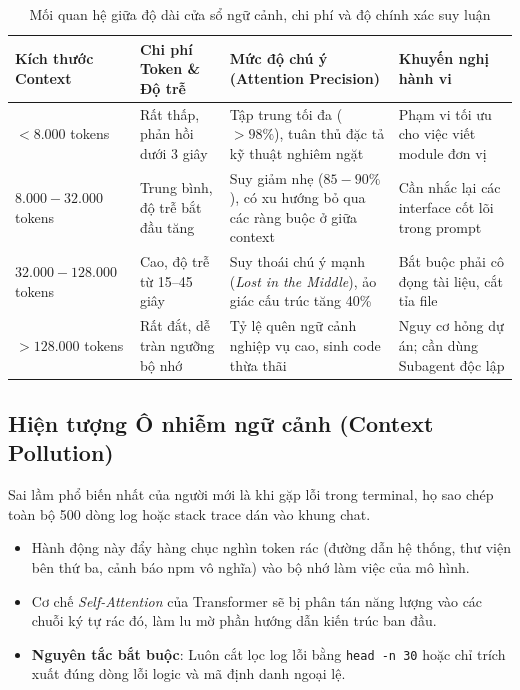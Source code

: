 \documentclass[a4paper,11pt]{article}
\begin{document}
\begin{table}[htbp]
\centering
\small
\caption{Mối quan hệ giữa độ dài cửa sổ ngữ cảnh, chi phí và độ chính xác suy luận}
\vspace{0.5em}
\begin{tabularx}{\textwidth}{L{2.5cm} L{3.5cm} L{4.5cm} Y}
\toprule
\textbf{Kích thước Context} & \textbf{Chi phí Token \& Độ trễ} & \textbf{Mức độ chú ý (Attention Precision)} & \textbf{Khuyến nghị hành vi} \\
\midrule
$< 8.000$ tokens & Rất thấp, phản hồi dưới 3 giây & Tập trung tối đa ($> 98\%$), tuân thủ đặc tả kỹ thuật nghiêm ngặt & Phạm vi tối ưu cho việc viết module đơn vị \\
$8.000 - 32.000$ tokens & Trung bình, độ trễ bắt đầu tăng & Suy giảm nhẹ ($85 - 90\%$), có xu hướng bỏ qua các ràng buộc ở giữa context & Cần nhắc lại các interface cốt lõi trong prompt \\
$32.000 - 128.000$ tokens & Cao, độ trễ từ 15--45 giây & Suy thoái chú ý mạnh (\textit{Lost in the Middle}), ảo giác cấu trúc tăng 40\% & Bắt buộc phải cô đọng tài liệu, cắt tỉa file \\
$> 128.000$ tokens & Rất đắt, dễ tràn ngưỡng bộ nhớ & Tỷ lệ quên ngữ cảnh nghiệp vụ cao, sinh code thừa thãi & Nguy cơ hỏng dự án; cần dùng Subagent độc lập \\
\bottomrule
\end{tabularx}
\end{table}

\subsection{Hiện tượng Ô nhiễm ngữ cảnh (Context Pollution)}
Sai lầm phổ biến nhất của người mới là khi gặp lỗi trong terminal, họ sao chép toàn bộ 500 dòng log hoặc stack trace dán vào khung chat. 
\begin{itemize}[leftmargin=1.5em]
    \item Hành động này đẩy hàng chục nghìn token rác (đường dẫn hệ thống, thư viện bên thứ ba, cảnh báo npm vô nghĩa) vào bộ nhớ làm việc của mô hình.
    \item Cơ chế \textit{Self-Attention} của Transformer sẽ bị phân tán năng lượng vào các chuỗi ký tự rác đó, làm lu mờ phần hướng dẫn kiến trúc ban đầu.
    \item \textbf{Nguyên tắc bắt buộc}: Luôn cắt lọc log lỗi bằng \texttt{head -n 30} hoặc chỉ trích xuất đúng dòng lỗi logic và mã định danh ngoại lệ.
\end{itemize}
\end{document}
